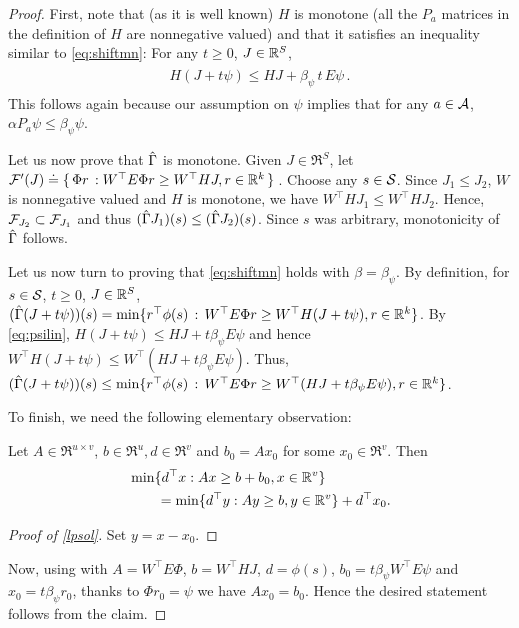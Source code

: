 \documentclass[12pt,draftcls,onecolumn]{IEEEtran}
\begin{document}
\begin{proof}
First, note that (as it is well known) $H$ is monotone (all
the $P_a$ matrices in the definition of $H$ are nonnegative valued)
and that it satisfies an inequality similar to \eqref{eq:shiftmn}: For any $t\ge 0$, $J\in \R^S$,
\begin{align}\label{eq:psilin}
\begin{split}
H(J+ t \psi ) \le HJ + \beta_{\psi}\,t\,  E  \psi\,.
\end{split}
\end{align}
This follows again because our assumption on $\psi$ implies that for any $a\in \A$, $\alpha P_a \psi \le \beta_{\psi} \psi$.

Let us now prove that $\hg$ is monotone.
Given $J\in \Re^S$, let $\F'(J)\eqdef\{\,\Phi r\,: W^\top E \Phi r\geq W^\top HJ, r\in \Re^k\,\}\,$.
Choose any $s\in \S$. Since $J_1\leq J_2$, $W$ is nonnegative valued and $H$ is monotone,
we have $W^\top H J_1\leq W^\top H J_2$.
Hence, $\F_{J_2} \subset \F_{J_1}$
and thus $(\hg J_1)(s) \le (\hg J_2)(s)$.  Since $s$ was arbitrary, monotonicity of $\hg$ follows.

Let us now turn to proving that \eqref{eq:shiftmn} holds with $\beta =\beta_\psi$.
By definition, for $s\in \S$, $t\ge 0$, $J\in \R^S$,
$(\hg (J+t\psi) )(s) = \min\{ r^\top \phi(s) \,:\, W^\top E\Phi r \ge W^\top H(J+t\psi), r\in \Re^k \}$.
By \eqref{eq:psilin},
$H(J+t\psi) \le HJ + t \beta_\psi E \psi$
and hence $W^\top H(J+t\psi) \le W^\top (HJ + t \beta_\psi E \psi)$.
Thus,
$(\hg (J+t\psi) )(s) \le  \min\{ r^\top \phi(s)\,:\, W^\top E\Phi r \ge W^\top (HJ+t\beta_\psi E \psi), r\in \Re^k \}$.

To finish, we need the following elementary observation:
\begin{claim}\label{lpsol}
Let $A\in \Re^{u\times v}$, $b\in \Re^u,d\in \Re^v$ and $b_0=Ax_0$ for
some $x_0 \in \Re^v$. %
Then
\begin{align*}
\begin{split}
\MoveEqLeft \min\{d^\top x:Ax\geq b+b_0, x\in \Re^v\} \nn\\
&=\min\{d^\top y:Ay \geq b, y \in \Re^v \}+d^\top x_0.
\end{split}
\end{align*}
\end{claim}
\begin{proof}[Proof of \cref{lpsol}]
Set $y = x-x_0$.
\end{proof}
Now, using  with $A=W^\top E \Phi$, $b=W^\top HJ$, $d=\phi(s)$, $b_0=t\beta_\psi W^\top E \psi$
and $x_0=t \beta_\psi r_0$,  thanks to $\Phi r_0 = \psi$ we have $A x_0 = b_0$.
Hence the desired statement follows from the claim.
\end{proof}
\end{document}
